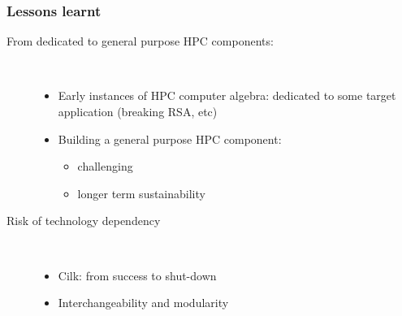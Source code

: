 \documentclass{beamer}
\begin{document}
\begin{frame}
  \frametitle{Lessons learnt}

  \begin{description}
    \item[From dedicated to general purpose HPC components:]\
      \begin{itemize}
      \item  Early instances of HPC computer algebra: dedicated to some target
        application (breaking RSA, etc)
      \item Building a general purpose HPC component:
        \begin{itemize}
        \item challenging
        \item longer term sustainability
        \end{itemize}
      \end{itemize}
    \item[Risk of technology dependency]\
      \begin{itemize}
      \item Cilk: from success to shut-down
      \item Interchangeability and modularity
      \end{itemize}
      \end{description}
  \end{frame}
\end{document}

